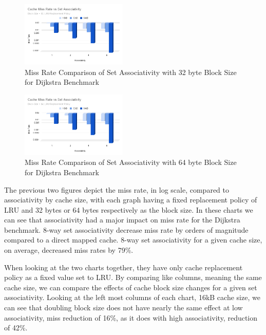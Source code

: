 \documentclass[conference]{IEEEtran}
\begin{document}
\begin{figure}[H]
  \centering
  \includegraphics[width=0.45\textwidth]{dijkstraFigures/CacheMissRateVsSetAssociativity32.png}
  \caption{Miss Rate Comparison of Set Associativity with 32 byte Block Size for Dijkstra Benchmark}
  \label{fig:MissRateVsSetAssoc32}
\end{figure}

\begin{figure}[H]
    \centering
    \includegraphics[width=0.45\textwidth]{dijkstraFigures/CacheMissRatevsSetAssociativity64.png}
    \caption{Miss Rate Comparison of Set Associativity with 64 byte Block Size for Dijkstra Benchmark}
    \label{fig:MissRateVsAssoc64}
  \end{figure}
    
The previous two figures depict the miss rate, in log scale, compared to associativity by cache size, with each graph having a fixed replacement policy of LRU and 32 bytes or 64 bytes respectively as the block size. In these charts we can see that associativity had a major impact on miss rate for the Dijkstra benchmark. 8-way set associativity decrease miss rate by orders of magnitude compared to a direct mapped cache. 8-way set associativity for a given cache size, on average, decreased miss rates by 79\%.

When looking at the two charts together, they have only cache replacement policy as a fixed value set to LRU. By comparing like columns, meaning the same cache size, we can compare the effects of cache block size changes for a given set associativity. Looking at the left most columns of each chart, 16kB cache size, we can see that doubling block size does not have nearly the same effect at low associativity, miss reduction of 16\%, as it does with high associativity, reduction of 42\%.
\end{document}
